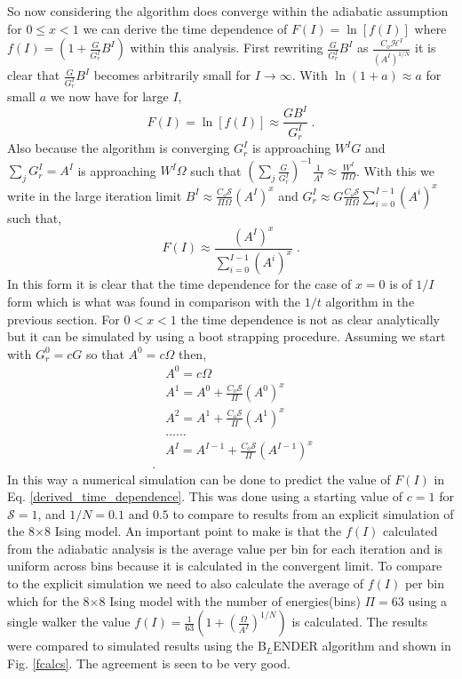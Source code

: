 \documentclass[aps,pre,reprint,superscriptaddress,showkeys]{revtex4-1}
\begin{document}
   So now considering the algorithm does converge within the adiabatic assumption for $0\le x < 1 $ we can derive the time dependence of $F(I)=\ln[f(I)]$ where $f(I) = (1 + \frac{G}{G_r^I}B^I)$ within this analysis. First rewriting $\frac{G}{G_r^I}B^I$ as $\frac{C_o\mathcal{H}^I}{(A^I)^{1/N}}$ it is clear that $\frac{G}{G_r^I}B^I$ becomes arbitrarily small for $I \rightarrow \infty$. With  $\ln(1+a) \approx a$ for small $a$ we now have for large $I$, 
\begin{equation}
F(I)= \ln[f(I)] \approx  \frac{GB^I}{G_r^I} \;.
\end{equation}
Also because the algorithm is converging $G_r^I$ is approaching $W^IG$ and $\sum_j G_r^I = A^I$ is approaching $W^I\Omega$ such that $(\sum_{j}\frac{G}{G_r^{I}})^{-1} \frac{1}{A^I}\approx \frac{W^I}{\Pi\Omega}$. With this we write  in the large iteration limit $B^I \approx  \frac{C_o\mathcal{S}}{\Pi\Omega}(A^I)^x$ and $G_r^I \approx G \frac{C_o\mathcal{S}}{\Pi\Omega}\sum_{i=0}^{I-1}(A^i)^x$ such that, 
\begin{equation}
F(I) \approx \frac{(A^I)^x}{\sum_{i=0}^{I-1}(A^i)^x} \;.
\label{derived_time_dependence}
\end{equation}
In this form it is clear that the time dependence for the case of $x=0$ is of $1/I$ form which is what was found in comparison with the $1/t$ algorithm in the previous section. For  $ 0 < x < 1$ the time dependence is not as clear analytically but it can be simulated by using a boot strapping procedure. Assuming we start with $G_r^0=cG$ so that $A^0=c\Omega$ then, 
\begin{equation}
\begin{split}
&A^0=c\Omega\\
&A^1 = A^0     +  \frac{C_o\mathcal{S}}{\Pi}(A^0)^x\\
&A^2 = A^1     +  \frac{C_o\mathcal{S}}{\Pi}(A^1)^x\\
&......\\
&A^I = A^{I-1} +  \frac{C_o\mathcal{S}}{\Pi}(A^{I-1})^x\\\;.
\end{split}
\label{bootstrap}
\end{equation} 
In this way a numerical simulation can be done to predict the value of $F(I)$ in Eq. \ref{derived_time_dependence}. This was done using a starting value of $c=1$ for $\mathcal{S}=1$, and $1/N = 0.1$ and $0.5$ to compare to results from an explicit simulation of the 8$\times$8 Ising model. An important point to make is that the $f(I)$ calculated from the adiabatic analysis is the average value per bin for each iteration and is uniform across bins because it is calculated in the convergent limit. To compare to the explicit simulation we need to also calculate the average of $f(I)$ per bin which for the 8$\times$8 Ising model with the number of energies(bins) $\Pi=63$ using a single walker the value $f(I) = \frac{1}{63}(1 + (\frac{\Omega }{A^I})^{1/N})$ is calculated.  The results were compared to simulated results using the B$_L$ENDER algorithm and shown in Fig. \ref{fcalcs}.   The agreement is seen to be very good. 
\end{document}

